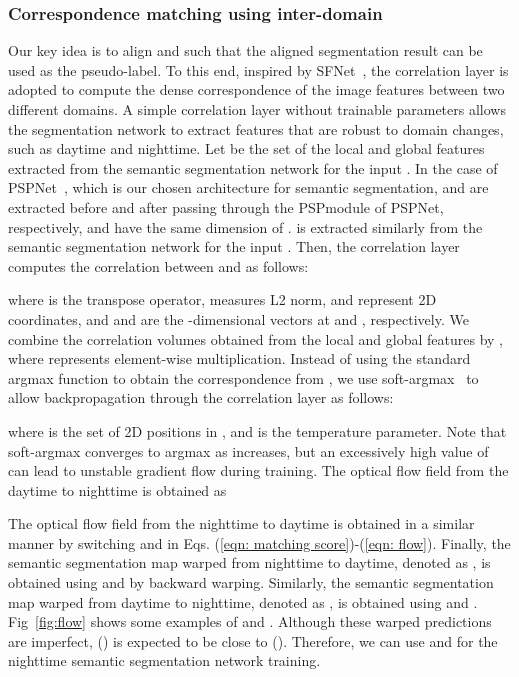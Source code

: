 \documentclass[10pt,twocolumn,letterpaper]{article}
\begin{document}
 \subsubsection{Correspondence matching using inter-domain}
Our key idea is to align  and  such that the aligned segmentation result can be used as the pseudo-label. To this end, inspired by SFNet~\cite{lee2019sfnet}, the correlation layer is adopted to compute the dense correspondence of the image features between two different domains. A simple correlation layer without trainable parameters allows the segmentation network to extract features that are robust to domain changes, such as daytime and nighttime. Let  be the set of the local and global features extracted from the semantic segmentation network for the input . In the case of PSPNet~\cite{zhao2017pyramid}, which is our chosen architecture for semantic segmentation,  and  are extracted before and after passing through the PSPmodule of PSPNet, respectively, and have the same dimension of .  is extracted similarly from the semantic segmentation network for the input . Then, the correlation layer computes the correlation between  and  as follows:
 
where  is the transpose operator,  measures L2 norm,  and  represent 2D coordinates, and  and  are the -dimensional vectors at  and , respectively. We combine the correlation volumes obtained from the local and global features by , where  represents element-wise multiplication. Instead of using the standard argmax function to obtain the correspondence from , we use soft-argmax~\cite{honari2018improving,kendall2017end} to allow backpropagation through the correlation layer as follows:
 
where  is the set of 2D positions in , and  is the temperature parameter. Note that soft-argmax converges to argmax as  increases, but an excessively high value of  can lead to unstable gradient flow during training. The optical flow field from the daytime to nighttime  is obtained as 
 
The optical flow field from the nighttime to daytime  is obtained in a similar manner by switching  and  in Eqs. (\ref{eqn: matching score})-(\ref{eqn: flow}). Finally, the semantic segmentation map warped from nighttime to daytime, denoted as , is obtained using  and  by backward warping. Similarly, the semantic segmentation map warped from daytime to nighttime, denoted as , is obtained using  and . Fig~\ref{fig:flow} shows some examples of  and . Although these warped predictions are imperfect,  () is expected to be close to  (). Therefore, we can use  and  for the nighttime semantic segmentation network training.
\end{document}
